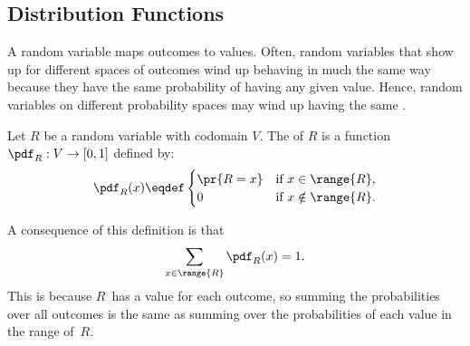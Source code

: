 \subsection{Distribution Functions}\label{distributions_sec}

A random variable maps outcomes to values. Often, random variables
that show up for different spaces of outcomes wind up behaving in much
the same way because they have the same probability of having any
given value.  Hence, random variables on different probability spaces
may wind up having the same .

\begin{definition}
Let $R$ be a random variable with codomain $V$.
The  of $R$
is a function $\pdf_R : V \to [0,1]$ defined by:
%
\[
\pdf_R(x) \eqdef \begin{cases}
            \pr{R = x} & \text{if } x \in \range{R},\\
             0 & \text{if } x \notin \range{R}.
           \end{cases}
\]
\end{definition}
%
A consequence of this definition is that
%
\[
\sum_{x \in \range{R}} \pdf_R(x) = 1.
\]
This is because $R$~has a value for each outcome, so summing the
probabilities over all outcomes is the same as summing over the
probabilities of each value in the range of~$R$.

